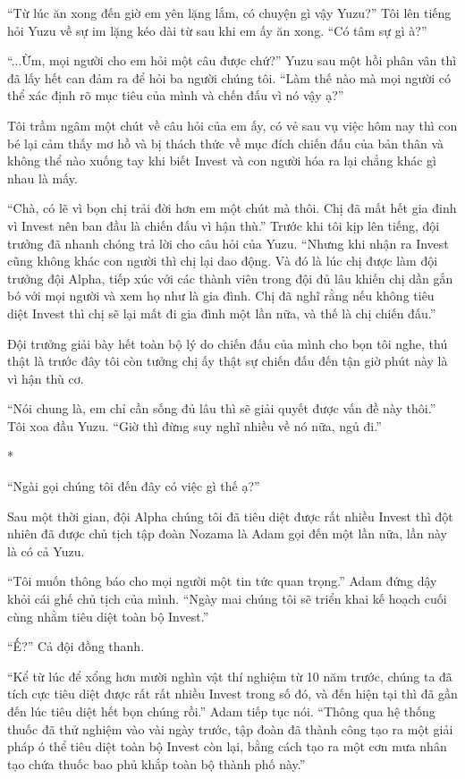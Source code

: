 {``Từ lúc ăn xong đến giờ em yên lặng lắm, có chuyện gì vậy Yuzu?'' Tôi
lên tiếng hỏi Yuzu về sự im lặng kéo dài từ sau khi em ấy ăn xong. ``Có
tâm sự gì à?''

``...Ừm, mọi người cho em hỏi một câu được chứ?'' Yuzu sau một hồi phân
vân thì đã lấy hết can đảm ra để hỏi ba người chúng tôi. ``Làm thế nào
mà mọi người có thể xác định rõ mục tiêu của mình và chến đấu vì nó vậy
ạ?''

Tôi trầm ngâm một chút về câu hỏi của em ấy, có vẻ sau vụ việc hôm nay
thì con bé lại cảm thấy mơ hồ và bị thách thức về mục đích chiến đấu của
bản thân và không thể nào xuống tay khi biết Invest và con người hóa ra
lại chẳng khác gì nhau là mấy.

``Chà, có lẽ vì bọn chị trải đời hơn em một chút mà thôi. Chị đã mất hết
gia đinh vì Invest nên ban đầu là chiến đấu vì hận thù.'' Trước khi tôi
kịp lên tiếng, đội trưởng đã nhanh chóng trả lời cho câu hỏi của Yuzu.
``Nhưng khi nhận ra Invest cũng không khác con người thì chị lại dao
động. Và đó là lúc chị được làm đội trưởng đội Alpha, tiếp xúc với các
thành viên trong đội đủ lâu khiến chị dần gắn bó với mọi người và xem họ
như là gia đình. Chị đã nghĩ rằng nếu không tiêu diệt Invest thì chị sẽ
lại mất đi gia đình một lần nữa, và thế là chị chiến đấu.''

Đội trưởng giải bày hết toàn bộ lý do chiến đấu của mình cho bọn tôi
nghe, thú thật là trước đây tôi còn tưởng chị ấy thật sự chiến đấu đến
tận giờ phút này là vì hận thù cơ.

``Nói chung là, em chỉ cần sống đủ lâu thì sẽ giải quyết được vấn đề này
thôi.'' Tôi xoa đầu Yuzu. ``Giờ thì đừng suy nghĩ nhiều về nó nữa, ngủ
đi.''

*

``Ngài gọi chúng tôi đến đây có việc gì thế ạ?''

Sau một thời gian, đội Alpha chúng tôi đã tiêu diệt được rất nhiều
Invest thì đột nhiên đã được chủ tịch tập đoàn Nozama là Adam gọi đến
một lần nữa, lần này là có cả Yuzu.

``Tôi muốn thông báo cho mọi người một tin tức quan trọng.'' Adam đứng
dậy khỏi cái ghế chủ tịch của mình. ``Ngày mai chúng tôi sẽ triển khai
kế hoạch cuối cùng nhằm tiêu diệt toàn bộ Invest.''

``Ế?'' Cả đội đồng thanh.

``Kể từ lúc để xổng hơn mười nghìn vật thí nghiệm từ 10 năm trước, chúng
ta đã tích cực tiêu diệt được rất rất nhiều Invest trong số đó, và đến
hiện tại thì đã gần đến lúc tiêu diệt hết bọn chúng rồi.'' Adam tiếp tục
nói. ``Thông qua hệ thống thuốc đã thử nghiệm vào vài ngày trước, tập
đoàn đã thành công tạo ra một giải pháp ó thể tiêu diệt toàn bộ Invest
còn lại, bằng cách tạo ra một cơn mưa nhân tạo chứa thuốc bao phủ khắp
toàn bộ thành phố này.''

}
